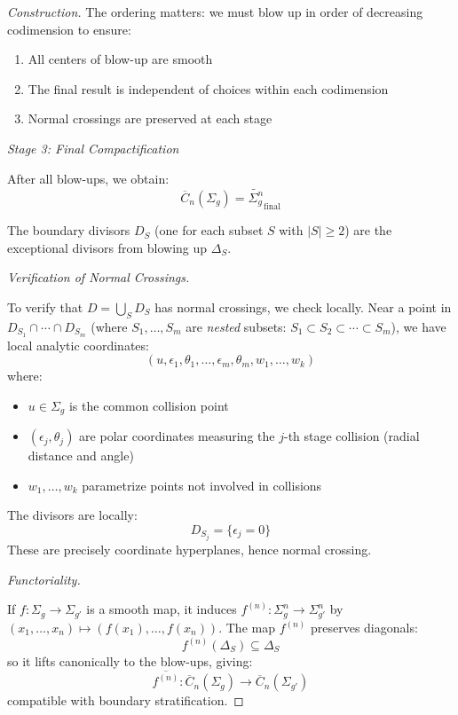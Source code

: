 \begin{proof}[Construction]
The ordering matters: we must blow up in order of decreasing codimension to ensure:
\begin{enumerate}
\item All centers of blow-up are smooth
\item The final result is independent of choices within each codimension
\item Normal crossings are preserved at each stage
\end{enumerate}

\medskip
\noindent\emph{Stage 3: Final Compactification}

After all blow-ups, we obtain:
\[\overline{C}_n(\Sigma_g) = \widetilde{\Sigma_g^n}_{\text{final}}\]

The boundary divisors $D_S$ (one for each subset $S$ with $|S| \geq 2$) are the exceptional divisors from blowing up $\Delta_S$. 

\medskip
\noindent\emph{Verification of Normal Crossings.}

To verify that $D = \bigcup_S D_S$ has normal crossings, we check locally. Near a point in $D_{S_1} \cap \cdots \cap D_{S_m}$ (where $S_1, \ldots, S_m$ are \emph{nested} subsets: $S_1 \subset S_2 \subset \cdots \subset S_m$), we have local analytic coordinates:
\[(u, \epsilon_1, \theta_1, \ldots, \epsilon_m, \theta_m, w_1, \ldots, w_k)\]
where:
\begin{itemize}
\item $u \in \Sigma_g$ is the common collision point
\item $(\epsilon_j, \theta_j)$ are polar coordinates measuring the $j$-th stage collision (radial distance and angle)
\item $w_1, \ldots, w_k$ parametrize points not involved in collisions
\end{itemize}

The divisors are locally:
\[D_{S_j} = \{\epsilon_j = 0\}\]
These are precisely coordinate hyperplanes, hence normal crossing.

\medskip
\noindent\emph{Functoriality.}

If $f: \Sigma_g \to \Sigma_{g'}$ is a smooth map, it induces $f^{(n)}: \Sigma_g^n \to \Sigma_{g'}^n$ by $(x_1,\ldots,x_n) \mapsto (f(x_1),\ldots,f(x_n))$. The map $f^{(n)}$ preserves diagonals:
\[f^{(n)}(\Delta_S) \subseteq \Delta_S\]
so it lifts canonically to the blow-ups, giving:
\[\overline{f^{(n)}}: \overline{C}_n(\Sigma_g) \to \overline{C}_n(\Sigma_{g'})\]
compatible with boundary stratification.
\end{proof}

